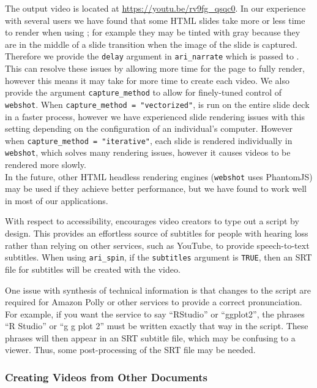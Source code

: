 The output video is located at \url{https://youtu.be/rv9fg_qsqc0}. In
our experience with several users we have found that some HTML slides
take more or less time to render when using ; for example
they may be tinted with gray because they are in the middle of a slide
transition when the image of the slide is captured. Therefore we provide
the \texttt{delay} argument in \texttt{ari\_narrate} which is passed to
. This can resolve these issues by allowing more time for
the page to fully render, however this means it may take for more time
to create each video. We also provide the argument
\texttt{capture\_method} to allow for finely-tuned control of
\texttt{webshot}. When \texttt{capture\_method\ =\ "vectorized"},
 is run on the entire slide deck in a faster process,
however we have experienced slide rendering issues with this setting
depending on the configuration of an individual's computer. However when
\texttt{capture\_method\ =\ "iterative"}, each slide is rendered
individually in \texttt{webshot}, which solves many rendering issues,
however it causes videos to be rendered more slowly.\\
In the future, other HTML headless rendering engines (\texttt{webshot}
uses PhantomJS) may be used if they achieve better performance, but we
have found  to work well in most of our applications.

With respect to accessibility,  encourages video creators to
type out a script by design. This provides an effortless source of
subtitles for people with hearing loss rather than relying on other
services, such as YouTube, to provide speech-to-text subtitles. When
using \texttt{ari\_spin}, if the \texttt{subtitles} argument is
\texttt{TRUE}, then an SRT file for subtitles will be created with the
video.

One issue with synthesis of technical information is that changes to the
script are required for Amazon Polly or other services to provide a
correct pronunciation. For example, if you want the service to say
``RStudio'' or ``ggplot2'', the phrases ``R Studio'' or ``g g plot 2''
must be written exactly that way in the script. These phrases will then
appear in an SRT subtitle file, which may be confusing to a viewer.
Thus, some post-processing of the SRT file may be needed.

\hypertarget{creating-videos-from-other-documents}{%
\subsubsection{Creating Videos from Other
Documents}\label{creating-videos-from-other-documents}}

